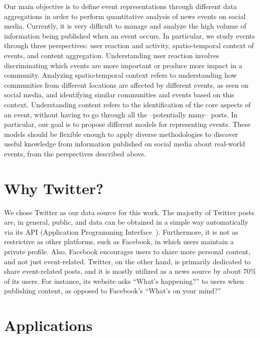 Our main objective is to define event representations through different data
aggregations in order to perform quantitative analysis of news events on social media.
%
Currently, it is very difficult to manage and analyze the high volume of
information being published when an event occurs. 
%
In particular, we study events through three perspectives: user reaction
and activity, spatio-temporal context of events, and content aggregation.
%
Understanding user reaction involves discriminating which events are more
important or produce more impact in a community. 
%
Analyzing spatio-temporal context refers to understanding how communities from
different locations are affected by different events, as seen on social media,
and identifying similar communities and events based on this context. 
%
Understanding content refers to the identification of the core aspects of an
event, without having to go through all the --potentially many-- posts.
%
In particular, our goal is to propose different models for representing events. 
%
These models should be flexible enough to apply diverse methodologies to
discover useful knowledge from information published on social media about
real-world events, from the perspectives described above. 



\section{Why Twitter?} 

We chose Twitter as our data source for this work. 
%
The majority of Twitter posts are, in general, public, and data can be obtained
in a simple way automatically via its API (Application Programming
Interface~\cite{twitterapi}).
%
Furthermore, it is not as restrictive as other platforms, such as Facebook,
in which users maintain a private profile.
%
Also, Facebook encourages users to share more personal content, and not just
event-related.
%
Twitter, on the other hand, is primarily dedicated to share event-related posts,
and it is mostly utilized as a news source by about 70\% of its users. 
%
For instance, its website asks ``What's happening?'' to users when publishing
content, as opposed to Facebook's ``What's on your mind?''


\section{Applications}

